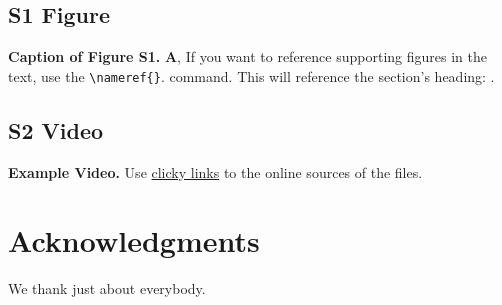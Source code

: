 \documentclass[10pt,letterpaper]{article}
\begin{document}
\setcounter{figure}{0}
\renewcommand{\thefigure}{S\arabic{figure}}

\subsection*{S1 Figure}
\label{example_label}
{\bf Caption of Figure S1.} \textbf{A}, If you want to reference supporting figures in the text, use the \verb!\nameref{}!. command. This will reference the section's heading: .

\subsection*{S2 Video}
\label{example_video}
{\bf Example Video.} Use \href{www.youtube.com}{clicky links} to the online sources of the files.


\section*{Acknowledgments}
We thank just about everybody.

\nolinenumbers




\end{document}
